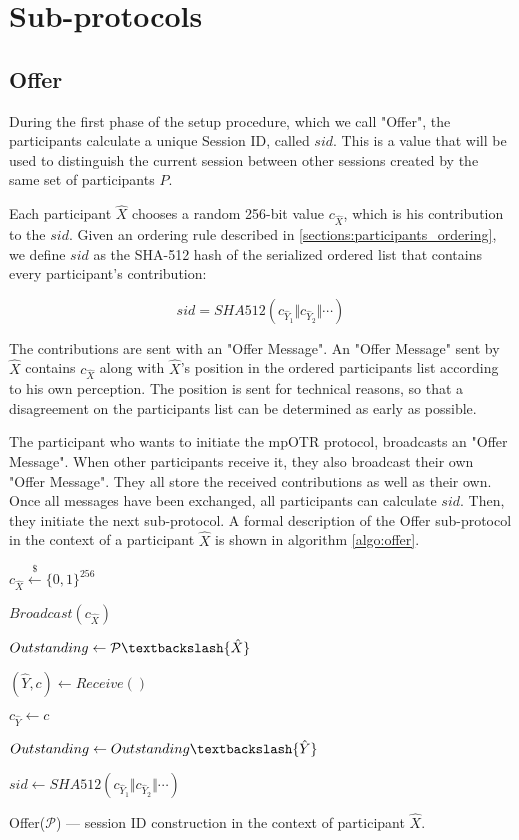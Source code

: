 \section{Sub-protocols}

\subsection{Offer}
\label{subsections:offer}
During the first phase of the setup procedure, which we call "Offer", the participants calculate a unique Session ID, called $sid$. This is a value that will be used to distinguish the current session between other sessions created by the same set of participants $P$.

Each participant $\hat{X}$ chooses a random 256-bit value $c_{\hat{X}}$, which is his contribution to the $sid$. Given an ordering rule described in \ref{sections:participants_ordering}, we define $sid$ as the SHA-512 hash of the serialized ordered list that contains every participant's contribution:

\[
  sid = SHA512(c_{\hat{Y}_1} \Vert c_{\hat{Y}_2} \Vert \cdots)
\]

The contributions are sent with an "Offer Message". An "Offer Message" sent by $\hat{X}$ contains $c_{\hat{X}}$ along with $\hat{X}$'s position in the ordered participants list according to his own perception. The position is sent for technical reasons, so that a disagreement on the participants list can be determined as early as possible.

The participant who wants to initiate the mpOTR protocol, broadcasts an "Offer Message". When other participants receive it, they also broadcast their own "Offer Message". They all store the received contributions as well as their own. Once all messages have been exchanged, all participants can calculate $sid$. Then, they initiate the next sub-protocol. A formal description of the Offer sub-protocol in the context of a participant $\hat{X}$ is shown in algorithm \ref{algo:offer}.

\begin{algorithm}[H]
  \Begin
  {
	$c_{\hat{X}} \xleftarrow{\$} \{0,1\}^{256}$
	
	$Broadcast(c_{\hat{X}})$
	
	$Outstanding \leftarrow \mathcal{P} \textbackslash \{\hat{X}\}$

    {    
      $(\hat{Y}, c) \leftarrow Receive()$
      
      {      
        $c_{\hat{Y}} \leftarrow c$
      
        $Outstanding \leftarrow Outstanding \textbackslash \{\hat{Y}\}$
      }
    }
   
    $sid \leftarrow SHA512(c_{\hat{Y}_1} \Vert c_{\hat{Y}_2} \Vert \cdots)$


  }
  \caption{Offer($\mathcal{P}$) --- session ID construction in the context of participant $\hat{X}$.}
  \label{algo:offer}
\end{algorithm}

